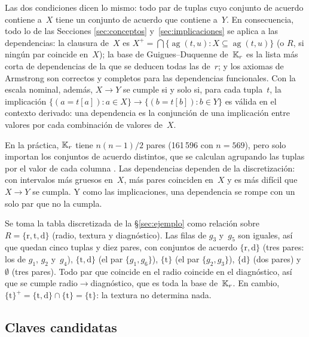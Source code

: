 Las dos condiciones dicen lo mismo: todo par de tuplas cuyo conjunto de acuerdo contiene a~$X$ tiene un conjunto de acuerdo que contiene a~$Y$. En consecuencia, todo lo de las Secciones \ref{sec:conceptos} y~\ref{sec:implicaciones} se aplica a las dependencias: la clausura de~$X$ es $X^{+} = \bigcap \{ \operatorname{ag}(t, u) : X \subseteq \operatorname{ag}(t, u) \}$ (o $R$, si ningún par coincide en~$X$); la base de Guigues--Duquenne de~$\mathbb{K}_r$ es la lista más corta de dependencias de la que se deducen todas las de~$r$; y los axiomas de Armstrong son correctos y completos para las dependencias funcionales. Con la escala nominal, además, $X \to Y$ se cumple si y solo si, para cada tupla~$t$, la implicación $\{(a{=}t[a]) : a \in X\} \to \{(b{=}t[b]) : b \in Y\}$ es válida en el contexto derivado: una dependencia es la conjunción de una implicación entre valores por cada combinación de valores de~$X$.

En la práctica, $\mathbb{K}_r$ tiene $n(n-1)/2$ pares (161\,596 con $n = 569$), pero solo importan los conjuntos de acuerdo distintos, que se calculan agrupando las tuplas por el valor de cada columna \parencite{mannila1994}. Las dependencias dependen de la discretización: con intervalos más gruesos en~$X$, más pares coinciden en~$X$ y es más difícil que $X \to Y$ se cumpla. Y como las implicaciones, una dependencia se rompe con un solo par que no la cumpla.

\begin{ejemplo}\label{ej:df}
Se toma la tabla discretizada de la \S\ref{sec:ejemplo} como relación sobre $R = \{\mathrm{r}, \mathrm{t}, \mathrm{d}\}$ (radio, textura y diagnóstico). Las filas de $g_3$ y~$g_5$ son iguales, así que quedan cinco tuplas y diez pares, con conjuntos de acuerdo $\{\mathrm{r}, \mathrm{d}\}$ (tres pares: los de $g_1$, $g_2$ y~$g_4$), $\{\mathrm{t}, \mathrm{d}\}$ (el par $\{g_1, g_6\}$), $\{\mathrm{t}\}$ (el par $\{g_2, g_3\}$), $\{\mathrm{d}\}$ (dos pares) y~$\emptyset$ (tres pares). Todo par que coincide en el radio coincide en el diagnóstico, así que se cumple radio${}\to{}$diagnóstico, que es toda la base de~$\mathbb{K}_r$. En cambio, $\{\mathrm{t}\}^{+} = \{\mathrm{t}, \mathrm{d}\} \cap \{\mathrm{t}\} = \{\mathrm{t}\}$: la textura no determina nada.
\end{ejemplo}


\subsection{Claves candidatas}
\label{sec:claves}

